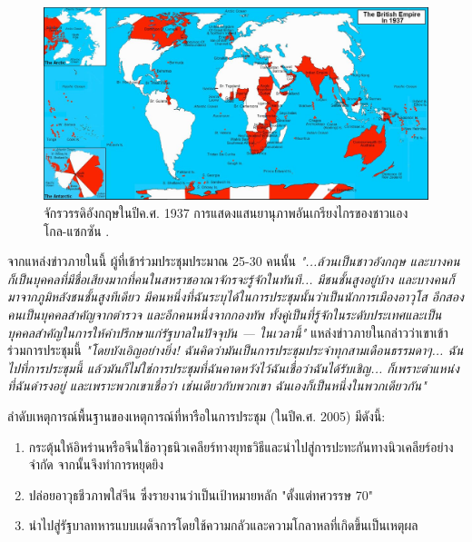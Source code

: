 \documentclass[10pt,twocolumn,letterpaper]{article}
\begin{document}
\begin{figure}[t]
\begin{center}
\includegraphics[width=1\textwidth]{british.jpg}
\end{center}
   \caption{จักรวรรดิอังกฤษในปีค.ศ. 1937 การแสดงแสนยานุภาพอันเกรียงไกรของชาวแองโกล-แซกซัน \cite{14}.}
   \label{fig:2}
\end{figure}
จากแหล่งข่าวภายในนี้ ผู้ที่เข้าร่วมประชุมประมาณ 25-30 คนนั้น \textit{"...ล้วนเป็นชาวอังกฤษ และบางคนก็เป็นบุคคลที่มีชื่อเสียงมากที่คนในสหราชอาณาจักรจะรู้จักในทันที... มีชนชั้นสูงอยู่บ้าง และบางคนก็มาจากภูมิหลังชนชั้นสูงทีเดียว มีคนหนึ่งที่ฉันระบุได้ในการประชุมนั้นว่าเป็นนักการเมืองอาวุโส อีกสองคนเป็นบุคคลสำคัญจากตำรวจ และอีกคนหนึ่งจากกองทัพ ทั้งคู่เป็นที่รู้จักในระดับประเทศและเป็นบุคคลสำคัญในการให้คำปรึกษาแก่รัฐบาลในปัจจุบัน — ในเวลานี้"} \cite{4} แหล่งข่าวภายในกล่าวว่าเขาเข้าร่วมการประชุมนี้ \textit{"โดยบังเอิญอย่างยิ่ง! ฉันคิดว่ามันเป็นการประชุมประจำทุกสามเดือนธรรมดาๆ... ฉันไปที่การประชุมนี้ แล้วมันก็ไม่ใช่การประชุมที่ฉันคาดหวังไว้ฉันเชื่อว่าฉันได้รับเชิญ... ก็เพราะตำแหน่งที่ฉันดำรงอยู่ และเพราะพวกเขาเชื่อว่า เช่นเดียวกับพวกเขา ฉันเองก็เป็นหนึ่งในพวกเดียวกัน"} \cite{4}

ลำดับเหตุการณ์พื้นฐานของเหตุการณ์ที่หารือในการประชุม (ในปีค.ศ. 2005) มีดังนี้:

\begin{flushleft}
\begin{enumerate}
    \item กระตุ้นให้อิหร่านหรือจีนใช้อาวุธนิวเคลียร์ทางยุทธวิธีและนำไปสู่การปะทะกันทางนิวเคลียร์อย่างจำกัด จากนั้นจึงทำการหยุดยิง
    \item ปล่อยอาวุธชีวภาพใส่จีน ซึ่งรายงานว่าเป็นเป้าหมายหลัก "ตั้งแต่ทศวรรษ 70"
    \item นำไปสู่รัฐบาลทหารแบบเผด็จการโดยใช้ความกลัวและความโกลาหลที่เกิดขึ้นเป็นเหตุผล
\end{enumerate}
\end{flushleft}
\end{document}
